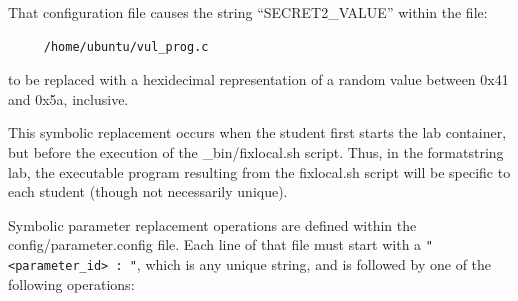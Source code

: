 \documentclass[12pt]{article}
\begin{document}
That configuration file causes the string ``SECRET2\_VALUE'' within the file:
\begin{verbatim}
     /home/ubuntu/vul_prog.c
\end{verbatim}
to be replaced with a hexidecimal representation of a random value
between 0x41 and 0x5a, inclusive.

This symbolic replacement occurs when the student first starts the lab container,
but before the execution of the \_bin/fixlocal.sh script.  Thus, in the formatstring
lab, the executable program resulting from the fixlocal.sh script will be specific
to each student (though not necessarily unique).

Symbolic parameter replacement operations are defined within the config/parameter.config file.
Each line of that file must start with a \verb!"<parameter_id> : "!, which is any unique string, and
is followed by one of the following operations:
\end{document}
